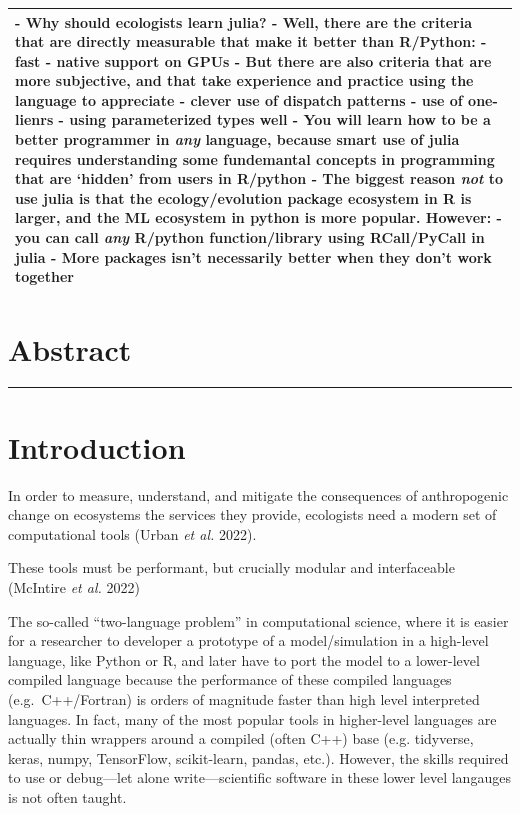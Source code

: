 \documentclass[11pt]{article}
\begin{document}
\begin{longtable}[]{@{}l@{}}
\toprule
\endhead
\begin{minipage}[t]{0.05\columnwidth}\raggedright
- Why should ecologists learn julia? - Well, there are the criteria that
are directly measurable that make it better than R/Python: - fast -
native support on GPUs - But there are also criteria that are more
subjective, and that take experience and practice using the language to
appreciate - clever use of dispatch patterns - use of one-lienrs - using
parameterized types well - You will learn how to be a better programmer
in \emph{any} language, because smart use of julia requires
understanding some fundemantal concepts in programming that are `hidden'
from users in R/python - The biggest reason \emph{not} to use julia is
that the ecology/evolution package ecosystem in R is larger, and the ML
ecosystem in python is more popular. However: - you can call \emph{any}
R/python function/library using RCall/PyCall in julia - More packages
isn't necessarily better when they don't work together\strut
\end{minipage}\tabularnewline
\bottomrule
\end{longtable}

\hypertarget{abstract}{%
\section{Abstract}\label{abstract}}

\begin{center}\rule{0.5\linewidth}{0.5pt}\end{center}

\hypertarget{introduction}{%
\section{Introduction}\label{introduction}}

In order to measure, understand, and mitigate the consequences of
anthropogenic change on ecosystems the services they provide, ecologists
need a modern set of computational tools (Urban \emph{et al.} 2022).

These tools must be performant, but crucially modular and interfaceable
(McIntire \emph{et al.} 2022)

The so-called ``two-language problem'' in computational science, where
it is easier for a researcher to developer a prototype of a
model/simulation in a high-level language, like Python or R, and later
have to port the model to a lower-level compiled language because the
performance of these compiled languages (e.g.~C++/Fortran) is orders of
magnitude faster than high level interpreted languages. In fact, many of
the most popular tools in higher-level languages are actually thin
wrappers around a compiled (often C++) base (e.g. tidyverse, keras,
numpy, TensorFlow, scikit-learn, pandas, etc.). However, the skills
required to use or debug---let alone write---scientific software in
these lower level langauges is not often taught.
\end{document}
